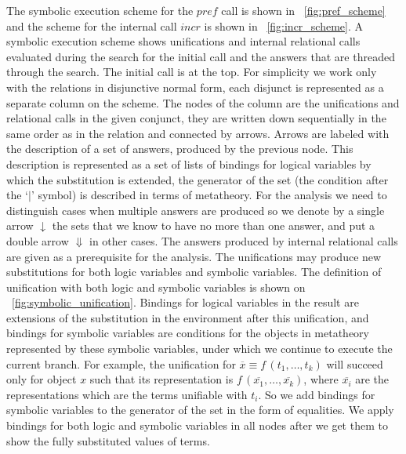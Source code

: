 The symbolic execution scheme for the $pref$ call is shown in \figureword~\ref{fig:pref_scheme} and the scheme for the internal call $incr$ is shown in \figureword~\ref{fig:incr_scheme}. A symbolic execution scheme shows unifications and internal relational calls evaluated during the search for the initial call and the answers that are threaded through the search. The initial call is at the top.
For simplicity we work only with the relations in disjunctive normal form, each disjunct is represented as a separate column on the scheme. The nodes of the column are
the unifications and relational calls in the given conjunct, they are written down sequentially in the same order as in the relation and connected by arrows. Arrows are
labeled with the description of a set of answers, produced by the previous node. This description is represented as a set of lists of bindings for logical variables by which the
substitution is extended, the generator of the set (the condition after the `$\mid$' symbol) is described in terms of metatheory. For the analysis we need to distinguish
cases when multiple answers are produced so we denote by a single arrow $\downarrow$ the sets that we know to have no more than one answer, and put a double arrow $\Downarrow$
in other cases. The answers produced by internal relational calls are given as a prerequisite for the analysis. The unifications may produce new substitutions for
both logic variables and symbolic variables. The definition of unification with both logic and symbolic variables is shown on \figureword~\ref{fig:symbolic_unification}.
Bindings for logical variables in the result are extensions of the substitution in the environment after this unification, and bindings for symbolic variables are conditions
for the objects in metatheory represented by these symbolic variables, under which we continue to execute the current branch. For example, the unification for $\overline{x} \equiv f\,(t_1, \dots, t_k)$ will succeed only for object $x$ such that its representation is $f\,(\overline{x_1}, \dots, \overline{x_k})$, where $\overline{x_i}$ are the representations which are the terms
unifiable with $t_i$. So we add bindings for symbolic variables to the generator of the set in the form of equalities. We apply bindings for both logic and symbolic variables in
all nodes after we get them to show the fully substituted values of terms.

